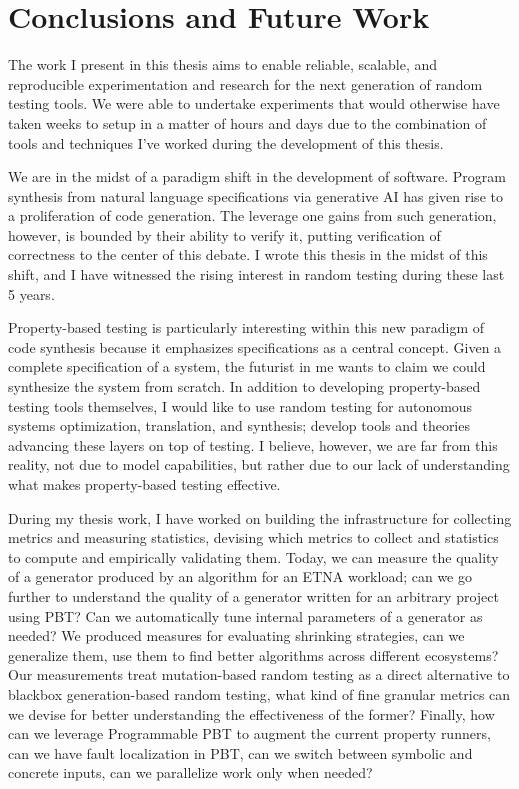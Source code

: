
\renewcommand{\thechapter}{5}

\chapter{Conclusions and Future Work}\label{chap:conclusion}

The work I present in this thesis aims to enable reliable, scalable, and reproducible
experimentation and research for the next generation of random testing tools. We were
able to undertake experiments that would otherwise have taken weeks to setup in a
matter of hours and days due to the combination of tools and techniques I've worked
during the development of this thesis.

We are in the midst of a paradigm shift in the development of software. Program
synthesis from natural language specifications via generative AI has given rise to a
proliferation of code generation. The leverage one gains from such generation, however,
is bounded by their ability to verify it, putting verification of correctness to the
center of this debate. I wrote this thesis in the midst of this shift, and I have
witnessed the rising interest in random testing during these last 5 years.

Property-based testing is particularly interesting within this new paradigm of code
synthesis because it emphasizes specifications as a central concept. Given a complete
specification of a system, the futurist in me wants to claim we could synthesize the
system from scratch. In addition to developing property-based testing tools themselves,
I would like to use random testing for autonomous systems optimization, translation,
and synthesis; develop tools and theories advancing these layers on top of testing. I
believe, however, we are far from this reality, not due to model capabilities, but
rather due to our lack of understanding what makes property-based testing effective.

During my thesis work, I have worked on building the infrastructure for collecting
metrics and measuring statistics, devising which metrics to collect and statistics to
compute and empirically validating them. Today, we can measure the quality of a
generator produced by an algorithm for an ETNA workload; can we go further to
understand the quality of a generator written for an arbitrary project using PBT? Can
we automatically tune internal parameters of a generator as needed? We produced
measures for evaluating shrinking strategies, can we generalize them, use them to find
better algorithms across different ecosystems? Our measurements treat mutation-based
random testing as a direct alternative to blackbox generation-based random testing,
what kind of fine granular metrics can we devise for better understanding the
effectiveness of the former? Finally, how can we leverage Programmable PBT to augment
the current property runners, can we have fault localization in PBT, can we switch
between symbolic and concrete inputs, can we parallelize work only when needed?

